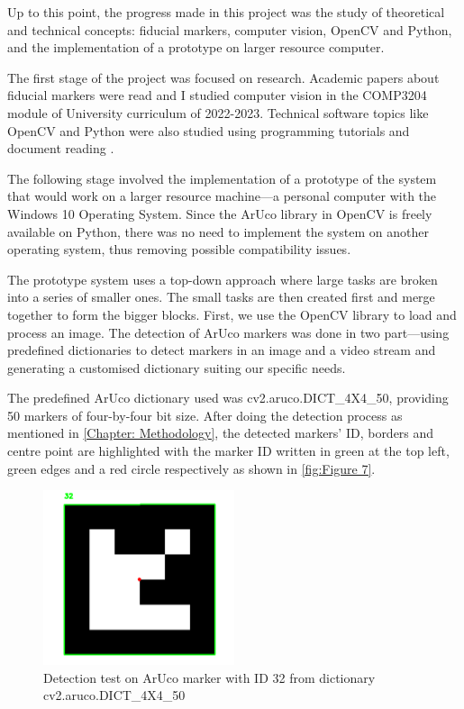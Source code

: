 \documentclass[12pt,a4paper]{report}
\def\aruco{ArUco }
\begin{document}
Up to this point, the progress made in this project was the study of theoretical and technical concepts: fiducial markers, computer vision, OpenCV and Python, and the implementation of a prototype on larger resource computer.

The first stage of the project was focused on research. Academic papers about fiducial markers \cite{garrido2014automatic}\cite{FMforposeestimation} were read and I studied computer vision in the COMP3204 module of University curriculum of 2022-2023. Technical software topics like OpenCV and Python were also studied using programming tutorials \cite{pyimagesearch} and document reading \cite{opencvarucomodule}.

The following stage involved the implementation of a prototype of the system that would work on a larger resource machine---a personal computer with the Windows 10 Operating System. Since the \aruco library in OpenCV is freely available on Python, there was no need to implement the system on another operating system, thus removing possible compatibility issues.

The prototype system uses a top-down approach where large tasks are broken into a series of smaller ones. The small tasks are then created first and merge together to form the bigger blocks.
First, we use the OpenCV library to load and process an image. The detection of \aruco markers was done in two part---using predefined dictionaries to detect markers in an image and a video stream and generating a customised dictionary suiting our specific needs.

The predefined \aruco dictionary used was cv2.aruco.DICT\_4X4\_50, providing 50 markers of four-by-four bit size. After doing the detection process as mentioned in \autoref{Chapter: Methodology}, the detected markers' ID, borders and centre point are highlighted with the marker ID written in green at the top left, green edges and a red circle respectively as shown in \autoref{fig:Figure 7}.

\begin{figure}[ht]
    \centering
    \includegraphics[width=0.5\textwidth]{Images/ArUco marker id 32 detection test.png}
    \caption[Detection test on \aruco marker]{Detection test on \aruco marker with ID 32 from dictionary cv2.aruco.DICT\_4X4\_50 }
    \label{fig:Figure 7}
\end{figure}
\end{document}

